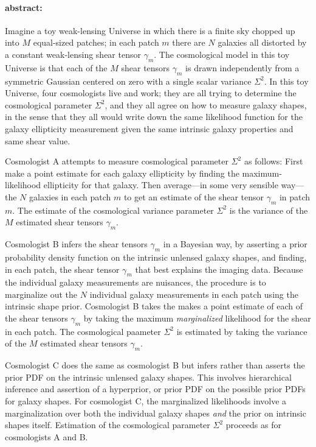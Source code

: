 \documentclass[12pt]{article}
\begin{document}
\paragraph{abstract:}
Imagine a toy weak-lensing Universe in which there is a finite sky
chopped up into $M$ equal-sized patches; in each patch $m$ there are
$N$ galaxies all distorted by a constant weak-lensing shear tensor
$\gamma_m$.  The cosmological model in this toy Universe is that each
of the $M$ shear tensors $\gamma_m$ is drawn independently from a
symmetric Gaussian centered on zero with a single scalar variance
$\Sigma^2$.  In this toy Universe, four cosmologists live and work;
they are all trying to determine the cosmological parameter
$\Sigma^2$, and they all agree on how to measure galaxy shapes, in the
sense that they all would write down the same likelihood function for
the galaxy ellipticity measurement given the same intrinsic galaxy
properties and same shear value.

Cosmologist A attempts to measure cosmological parameter $\Sigma^2$ as
follows: First make a point estimate for each galaxy ellipticity by
finding the maximum-likelihood ellipticity for that galaxy. Then
average---in some very sensible way---the $N$ galaxies in each patch
$m$ to get an estimate of the shear tensor $\gamma_m$ in patch $m$.
The estimate of the cosmological variance parameter $\Sigma^2$ is the
variance of the $M$ estimated shear tensors $\gamma_m$.

Cosmologist B infers the shear tensors $\gamma_m$ in a Bayesian way,
by asserting a prior probability density function on the intrinsic
unlensed galaxy shapes, and finding, in each patch, the shear tensor
$\gamma_m$ that best explains the imaging data.  Because the
individual galaxy measurements are nuisances, the procedure is to
marginalize out the $N$ individual galaxy measurements in each patch
using the intrinsic shape prior.  Cosmologist B takes the makes a
point estimate of each of the shear tensors $\gamma_m$ by taking the
maximum \emph{marginalized} likelihood for the shear in each patch.
The cosmological paameter $\Sigma^2$ is estimated by taking the
variance of the $M$ estimated shear tensors $\gamma_m$.

Cosmologist C does the same as cosmologist B but infers rather than
asserts the prior PDF on the intrinsic unlensed galaxy shapes.  This
involves hierarchical inference and assertion of a hyperprior, or
prior PDF on the possible prior PDFs for galaxy shapes.  For
cosmologist C, the marginalized likelihoods involve a marginalization
over both the individual galaxy shapes \emph{and} the prior on
intrinsic shapes itself.  Estimation of the cosmological parameter
$\Sigma^2$ proceeds as for cosmologists A and B.
\end{document}
